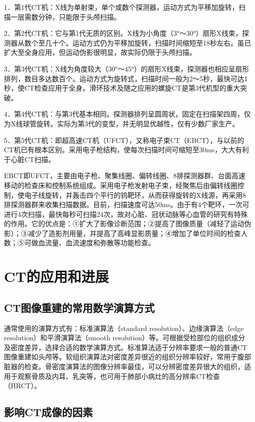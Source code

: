 1．第1代CT机：X线为单射束，单个或数个探测器，运动方式为平移加旋转，扫描一层需数分钟，只能限于头颅扫描。

2．第2代CT机：它与第1代无质的区别。X线为小角度（3°～30°）扇形X线束，探测器从数个至几十个。运动方式仍为平移加旋转，扫描时间缩短至18秒左右。虽已扩大至全身应用，但运动伪影很明显，故实际仍限于头颅扫描。

3．第3代CT机：X线为角度较大（30°～45°）的扇形X线束，探测器也相应呈扇形排列，数目多达数百个。运动方式为旋转式，扫描时间一般为2～5秒，最快可达1秒，使CT检查应用于全身。滑环技术及随之应用的螺旋CT是第3代机型的重大突破。

4．第4代CT机：与第3代基本相同。探测器排列呈圆周状，固定在扫描架四周，仅为X线球管旋转。实际为第3代的变型，并无明显优越性，仅有少数厂家生产。

5．第5代CT机：即超高速CT机（UFCT），又称电子束CT（EBCT），与以前的CT机已有根本区别。采用电子枪结构，使每次扫描时间可缩短至30ms，大大有利于心脏CT扫描。

EBCT即UFCT，主要由电子枪、聚集线圈、偏转线圈、8排探测器群、台面高速移动的检查床和控制系统组成。采用电子枪发射电子束，经聚焦后由偏转线圈控制，使电子线旋转，并轰击四个平行的钨靶环，从而获得旋转的X线源，再采用8排探测器群来收集扫描数据。目前，扫描速度可达50ms。由于有4个靶环，一次可进行4次扫描，最快每秒可扫描24次，故对心脏、冠状动脉等心血管的研究有特殊的作用。它的优点是：①扩大了影像诊断范围；②提高了图像质量（减轻了运动伪影）；③减少了造影剂用量，并提高了高峰显影质量；④增加了单位时间的检查人数；⑤可做血流量、血流速度和弥散等功能检查。

\section{CT的应用和进展}

\subsection{CT图像重建的常用数学演算方式}

通常使用的演算方式有：标准演算法（standard
resolution）、边缘演算法（edge resolution）和平滑演算法（smooth
resolution）等。可根据受检部位的组织成分及密度差异，选择合适的数学演算方式。标准算法适于分辨率要求一般的普通CT图像重建如头颅等。软组织演算法对密度差异很近的组织分辨率较好，常用于腹部脏器的检查。骨密度演算法的图像分辨率最佳，可以分辨密度差异很大的组织，适用于观察骨质及内耳、乳突等，也可用于肺部小病灶的高分辨率CT检查（HRCT）。

\subsection{影响CT成像的因素}

